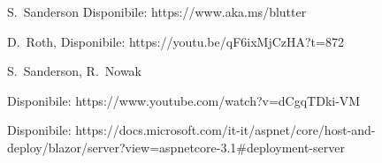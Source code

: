 \begin{thebibliography}{999}
S.~Sanderson
Disponibile: https://www.aka.ms/blutter

D.~Roth,
Disponibile: https://youtu.be/qF6ixMjCzHA?t=872

S.~Sanderson, R.~Nowak

Disponibile: https://www.youtube.com/watch?v=dCgqTDki-VM

Disponibile: https://docs.microsoft.com/it-it/aspnet/core/host-and-deploy/blazor/server?view=aspnetcore-3.1\#deployment-server


%
%
%
%
%
%
%



\end{thebibliography}
